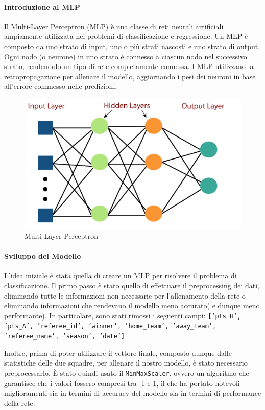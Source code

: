 \paragraph{Introduzione al MLP}
Il Multi-Layer Perceptron (MLP) è una classe di reti neurali artificiali ampiamente utilizzata nei problemi di classificazione e regressione. Un MLP è composto da uno strato di input, uno o più strati nascosti e uno strato di output. Ogni nodo (o neurone) in uno strato è connesso a ciascun nodo nel successivo strato, rendendolo un tipo di rete completamente connessa. I MLP utilizzano la retropropagazione per allenare il modello, aggiornando i pesi dei neuroni in base all'errore commesso nelle predizioni.
\begin{figure}[H]
    \centering
    \includegraphics[width=0.3\linewidth]{img/multi-layer-perceptron-in-tensorflow.png}
    \caption{Multi-Layer Perceptron}
    \label{fig:enter-label}
\end{figure}

\paragraph{Sviluppo del Modello}
L'idea iniziale è stata quella di creare un MLP per risolvere il problema di classificazione. Il primo passo è stato quello di effettuare il preprocessing dei dati, eliminando tutte le informazioni non necessarie per l'allenamento della rete o eliminando informazioni che rendevano il modello meno accurato( e dunque meno performante). In particolare, sono stati rimossi i seguenti campi: \newline
\texttt{['pts\_H', 'pts\_A', 'referee\_id', 'winner', 'home\_team', 'away\_team', 'referee\_name', \newline
'season', 'date']}

Inoltre, prima di poter utilizzare il vettore finale, composto dunque dalle statistiche delle due squadre, per allenare il nostro modello, è stato necessario preprocessarlo. È stato quindi usato il \texttt{MinMaxScaler}, ovvero un algoritmo che garantisce che i valori fossero compresi tra -1 e 1, il che ha portato notevoli miglioramenti sia in termini di accuracy del modello sia in termini di performance della rete.

